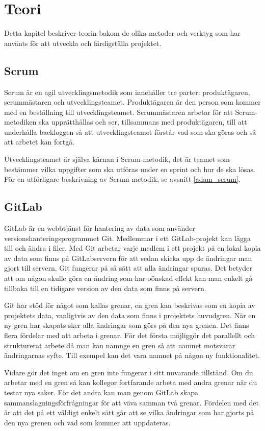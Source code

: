 \chapter{Teori}
Detta kapitel beskriver teorin bakom de olika metoder och verktyg som har använts för att utveckla och färdigställa projektet.

\section{Scrum} \label{scrum}
Scrum är en agil utvecklingsmetodik som innehåller tre parter: produktägaren, scrummästaren och utvecklingsteamet.
Produktägaren är den person som kommer med en beställning till utvecklingsteamet.
Scrummästaren arbetar för att Scrum-metodiken ska upprätthållas och ser, tillsammans med produktägaren, till att underhålla backloggen så att utvecklingsteamet förstår vad som ska göras och så att arbetet kan fortgå.

Utvecklingsteamet är själva kärnan i Scrum-metodik, det är teamet som bestämmer vilka uppgifter som ska utföras under en sprint och hur de ska lösas.
För en utförligare beskrivning av Scrum-metodik, se avsnitt \ref{adam_scrum}.

\section{GitLab}
GitLab är en webbtjänst för hantering av data som använder versionshanteringsprogrammet Git. Medlemmar i ett GitLab-projekt kan lägga till och ändra i filer.
Med Git arbetar varje medlem i ett projekt på en lokal kopia av data som finns på GitLabservern för att sedan skicka upp de ändringar man gjort till servern. Git fungerar på så sätt att alla ändringar sparas. Det betyder att om någon skulle göra en ändring som har oönskad effekt kan man enkelt gå tillbaka till en tidigare version av den data som finns på servern.

Git har stöd för något som kallas grenar, en gren kan beskrivas som en kopia av projektets data, vanligtvis av den data som finns i projektets huvudgren. När en ny gren har skapats sker alla ändringar som görs på den nya grenen. Det finns flera fördelar med att arbeta i grenar. För det första möjliggör det parallellt och strukturerat arbete då man kan namnge en gren så att namnet motsvarar ändringarnas syfte. Till exempel kan det vara namnet på någon ny funktionalitet.

Vidare gör det inget om en gren inte fungerar i sitt nuvarande tillstånd. Om du arbetar med en gren så kan kollegor fortfarande arbeta med andra grenar när du testar nya saker.
För det andra kan man genom GitLab skapa sammanslagningsförfrågningar för att väva samman två grenar.
Fördelen med det är att det på ett väldigt enkelt sätt går att se vilka ändringar som har gjorts på den nya grenen och vad som kommer att uppdateras.

